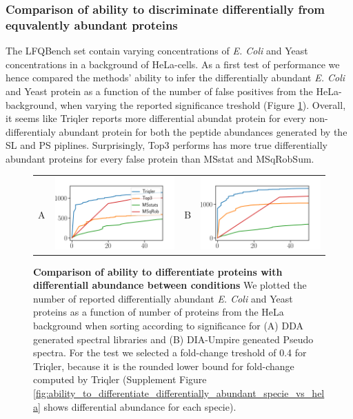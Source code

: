 \documentclass[10pt,letterpaper]{article}
\begin{document}
\subsubsection*{Comparison of ability to discriminate differentially from equvalently abundant proteins}

The LFQBench set contain varying concentrations of {\em E. Coli} and Yeast concentrations in a background of HeLa-cells. As a first test of performance we hence compared the methods' ability to infer the differentially abundant {\em E. Coli} and Yeast protein as a function of the number of false positives from the HeLa-background, when varying the reported significance treshold (Figure \ref{fig:diff_vs_hela}).  Overall, it seems like Triqler reports more differential abundat protein for every non-differentialy abundant protein for both the peptide abundances generated by the SL and PS piplines. Surprisingly, Top3 performs has more true differentially abundant proteins for every false protein than MSstat and MSqRobSum. 


\begin{figure}[hbt]
    \centering
    \begin{tabular}{lclc} 
        A & \includegraphics[width=0.45\linewidth]{../../result/report_plots_filtered/osw_de_human_vs_ecoli_and_yeast.png} & 
        B & \includegraphics[width=0.45\linewidth]{../../result/report_plots_filtered/diann_de_human_vs_ecoli_and_yeast.png} \\ 

    \end{tabular}
    \caption{{\bf Comparison of ability to differentiate proteins with differentiall abundance between conditions} We plotted the number of reported differentially abundant  {\em E. Coli} and Yeast proteins as a function of number of proteins from the HeLa background when sorting according to significance for (A) DDA generated spectral libraries and (B) DIA-Umpire geneated Pseudo spectra. For the test we selected a fold-change treshold of 0.4 for Triqler, because it is the rounded lower bound for fold-change computed by Triqler (Supplement Figure \ref{fig:ability_to_differentiate_differentially_abundant_specie_vs_hela} shows differential abundance for each specie). \label{fig:diff_vs_hela}}
\end{figure}
\end{document}
